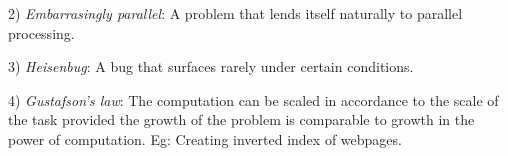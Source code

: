 \documentclass[twoside]{article}
\begin{document}
2) \textit{Embarrasingly parallel}: A problem that lends itself naturally to parallel processing.

3) \textit{Heisenbug}: A bug that surfaces rarely under certain conditions.

4) \textit{Gustafson's law}: The computation can be scaled in accordance to the scale of the task provided the growth of the problem is comparable to growth in the power of computation.
 Eg: Creating inverted index of webpages.
\end{document}

